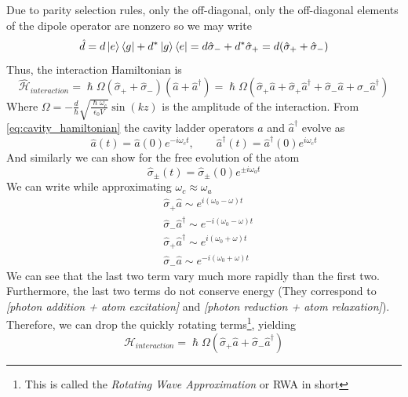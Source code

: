Due to parity selection rules, only the off-diagonal, only the off-diagonal elements of the dipole operator are nonzero so we may write
\[
    \hat{d} = d\ket{e}\bra{g} + d^* \ket{g}\bra{e} = d\hat{\sigma}_- + d^* \hat{\sigma}_+ = d (\hat{\sigma}_+ + \hat{\sigma}_-)
\]
Thus, the interaction Hamiltonian is
\begin{equation}
    \hat{\mathcal{H}}_{\textit{interaction}} = \hslash\Omega (\hat{\sigma}_+ + \hat{\sigma}_-) (\hat{a} +  \hat{a}^\dag) 
    = \hslash\Omega (\hat{\sigma}_+\hat{a} + \hat{\sigma}_+\hat{a}^\dag + \hat{\sigma}_-\hat{a} + \hat{\sigma}_-\hat{a}^\dag) 
\end{equation} \label{eq:interaction-hamiltonian}
Where $\Omega = -\frac{d}{\hslash}\sqrt{\frac{\hslash \omega_c}{\epsilon_0 V}} \sin (kz)$ is the amplitude of the interaction.
From \ref{eq:cavity_hamiltonian} the cavity ladder operators $\hat{a}$ and $\hat{a}^\dag$ evolve as
\begin{equation}
    \hat{a} (t) = \hat{a} (0)e^{-i\omega_c t}, \quad\quad \hat{a}^\dag{} (t) = \hat{a}^\dag{} (0)e^{i\omega_c t}
\end{equation}
And similarly we can show for the free evolution of the atom
\begin{equation}
    \hat{\sigma}_{\pm} (t) =   \hat{\sigma}_{\pm} (0)e^{\pm i\omega_a t}
\end{equation}
We can write while approximating $\omega_c \approx \omega_a$
\begin{equation}
    \begin{split}
        &\hat{\sigma}_+\hat{a} \sim e^{i (\omega_0 - \omega)t}\\
        &\hat{\sigma}_-\hat{a}^\dag \sim e^{-i (\omega_0 - \omega)t}\\
        &\hat{\sigma}_+\hat{a}^\dag \sim e^{i (\omega_0 + \omega)t}\\
        &\hat{\sigma}_-\hat{a} \sim e^{-i (\omega_0 + \omega)t}
    \end{split}
\end{equation}
We can see that the last two term vary much more rapidly than the first two. Furthermore, the last two terms do not conserve energy (They correspond to \textit{[photon addition + atom excitation]} and \textit{[photon reduction + atom relaxation]}). Therefore, we can drop the quickly rotating terms\footnote{This is called the \textit{Rotating Wave Approximation} or RWA in short}, yielding
\begin{equation} \label{eq:interaction-hamiltonian-RWA}
    \boxed{\mathcal{H}_{interaction} = \hslash\Omega (\hat{\sigma}_+\hat{a} + \hat{\sigma}_-\hat{a}^\dag)}
\end{equation}

